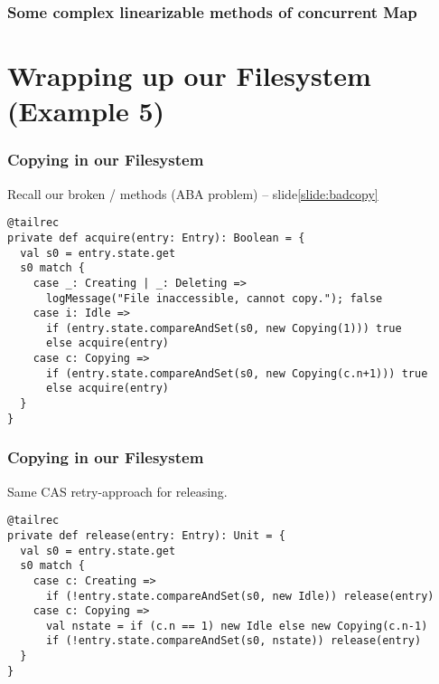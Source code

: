 \documentclass[aspectratio=169]{beamer}
\begin{document}
\begin{frame}\frametitle{Some complex linearizable methods of concurrent Map}
    \centering

\end{frame}


\section*{Wrapping up our Filesystem (Example 5)}

\begin{frame}[fragile]\frametitle{Copying in our Filesystem}
    Recall our \alert{broken} / methods (\alert{ABA problem}) -- slide\ref{slide:badcopy}

\begin{lstlisting}[emph={execute,sleep,log,Copying,aquire,compareAndSet}]
@tailrec
private def acquire(entry: Entry): Boolean = {
  val s0 = entry.state.get
  s0 match {
    case _: Creating | _: Deleting =>
      logMessage("File inaccessible, cannot copy."); false
    case i: Idle =>
      if (entry.state.compareAndSet(s0, new Copying(1))) true
      else acquire(entry)
    case c: Copying =>
      if (entry.state.compareAndSet(s0, new Copying(c.n+1))) true
      else acquire(entry)
  }
}
\end{lstlisting}
\end{frame}


\begin{frame}[fragile]\frametitle{Copying in our Filesystem}
    Same CAS retry-approach for releasing.

\begin{lstlisting}[emph={execute,sleep,log,Copying,release,compareAndSet}]
@tailrec
private def release(entry: Entry): Unit = {
  val s0 = entry.state.get
  s0 match {
    case c: Creating =>
      if (!entry.state.compareAndSet(s0, new Idle)) release(entry)
    case c: Copying =>
      val nstate = if (c.n == 1) new Idle else new Copying(c.n-1)
      if (!entry.state.compareAndSet(s0, nstate)) release(entry)
  }
}
\end{lstlisting}
\end{frame}
\end{document}

